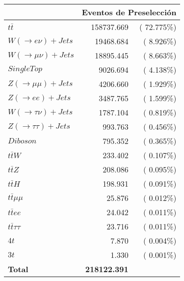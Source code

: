 \begin{tabular}{lrr}
\toprule
                         & \multicolumn{2}{c}{Eventos de Preselección} \\
\midrule
$t\bar{t}$               & 158737.669          & ( 72.775\%) \\
$W(\to e\nu) + Jets$     & 19468.684           & (  8.926\%) \\
$W(\to \mu\nu) + Jets$   & 18895.445           & (  8.663\%) \\
$Single Top$             & 9026.694            & (  4.138\%) \\
$Z(\to \mu\mu) + Jets$   & 4206.660            & (  1.929\%) \\
$Z(\to ee) + Jets$       & 3487.765            & (  1.599\%) \\
$W(\to \tau\nu) + Jets$  & 1787.104            & (  0.819\%) \\
$Z(\to \tau\tau) + Jets$ & 993.763             & (  0.456\%) \\
$Diboson$                & 795.352             & (  0.365\%) \\
$t\bar{t}W$              & 233.402             & (  0.107\%) \\
$t\bar{t}Z$              & 208.086             & (  0.095\%) \\
$t\bar{t}H$              & 198.931             & (  0.091\%) \\
$t\bar{t}\mu\mu$         & 25.876              & (  0.012\%) \\
$t\bar{t}ee$             & 24.042              & (  0.011\%) \\
$t\bar{t}\tau\tau$       & 23.716              & (  0.011\%) \\
$4t$                     & 7.870               & (  0.004\%) \\
$3t$                     & 1.330               & (  0.001\%) \\
\textbf{Total}           & \textbf{218122.391} &             \\
\bottomrule
\end{tabular}
